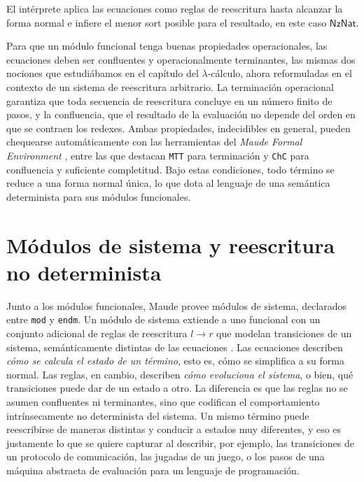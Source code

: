 El intérprete aplica las ecuaciones como reglas de reescritura hasta alcanzar la forma normal e infiere el menor sort posible para el resultado, en este caso $\mathsf{NzNat}$.

Para que un módulo funcional tenga buenas propiedades operacionales, las ecuaciones deben ser confluentes y operacionalmente terminantes, las mismas dos nociones que estudiábamos en el capítulo del $\lambda$-cálculo, ahora reformuladas en el contexto de un sistema de reescritura arbitrario. La terminación operacional garantiza que toda secuencia de reescritura concluye en un número finito de pasos, y la confluencia, que el resultado de la evaluación no depende del orden en que se contraen los redexes. Ambas propiedades, indecidibles en general, pueden chequearse automáticamente con las herramientas del \textit{Maude Formal Environment} \citep{duran2019}, entre las que destacan \texttt{MTT} para terminación y \texttt{ChC} para confluencia y suficiente completitud. Bajo estas condiciones, todo término se reduce a una forma normal única, lo que dota al lenguaje de una semántica determinista para sus módulos funcionales.

\section{Módulos de sistema y reescritura no determinista}
Junto a los módulos funcionales, Maude provee módulos de sistema, declarados entre \texttt{mod} y \texttt{endm}. Un módulo de sistema extiende a uno funcional con un conjunto adicional de reglas de reescritura $l \to r$ que modelan transiciones de un sistema, semánticamente distintas de las ecuaciones \citep{clavel2007}. Las ecuaciones describen \textit{cómo se calcula el estado de un término}, esto es, cómo se simplifica a su forma normal. Las reglas, en cambio, describen \textit{cómo evoluciona el sistema}, o bien, qué transiciones puede dar de un estado a otro. La diferencia es que las reglas no se asumen confluentes ni terminantes, sino que codifican el comportamiento intrínsecamente no determinista del sistema. Un mismo término puede reescribirse de maneras distintas y conducir a estados muy diferentes, y eso es justamente lo que se quiere capturar al describir, por ejemplo, las transiciones de un protocolo de comunicación, las jugadas de un juego, o los pasos de una máquina abstracta de evaluación para un lenguaje de programación.

